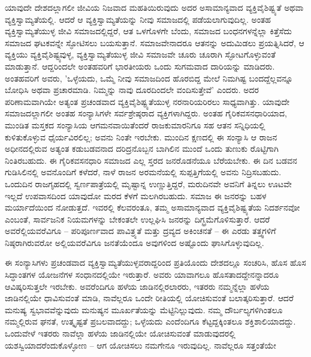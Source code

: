 ಯಾವುದೇ ದೇಶದಲ್ಲಾಗಲೀ ಜೀವಿಯ ನಿಜವಾದ ಮಹತಿಯಿರುವುದು ಅದರ ಅಸಾಮಾನ್ಯವಾದ ವ್ಯಕ್ತಿವೈಶಿಷ್ಟ್ಯತೆ ಅಥವಾ ವ್ಯಕ್ತಿಸ್ವಾಮ್ಯತೆಯಲ್ಲಿ. ಆದರೆ ಆ ವ್ಯಕ್ತಿಸ್ವಾಮ್ಯತೆಯನ್ನು ನೀವು ಸಮಾಜದಲ್ಲಿ ಪಡೆಯಲಾಗುವುದಿಲ್ಲ. ಅಂತಹ ವ್ಯಕ್ತಿಸ್ವಾಮ್ಯತೆಯುಳ್ಳ ಜೀವಿ ಸಮಾಜದಲ್ಲಿದ್ದರೆ, ಆತ ಒಳಗೊಳಗೇ ಬೆಂದು, ಸಮಾಜದ ಬಂಧನಗಳನ್ನೆಲ್ಲಾ ಕಿತ್ತೆಸೆದು ಸಮಾಜದ ಘಟಕವನ್ನೇ ಸ್ಫೋಟಿಸಲು ಬಯಸುತ್ತಾನೆ. ಸಮಾಜವೇನಾದರೂ ಆತನನ್ನು ಅದುಮಿಡಲು ಪ್ರಯತ್ನಿಸಿದರೆ, ಆ ವ್ಯಕ್ತಿಯು ವ್ಯಕ್ತಿವೈಶಿಷ್ಟ್ಯವುಳ್ಳ, ವ್ಯಕ್ತಿಸ್ವಾಮ್ಯತೆಯುಳ್ಳ ಜೀವಿ ಸಮಾಜವೇ ಚೂರು ಚೂರಾಗಿ ಸ್ಫೋಟಗೊಳ್ಳುವಂತೆ ಮಾಡುತ್ತಾನೆ. ಆದ್ದರಿಂದಲೇ ಅಂತಹವರಿಗೆ ಭಾರತೀಯರು ಒಂದು ಸುಗಮವಾದ ದಾರಿಯನ್ನು ಮಾಡಿದರು. ಅಂತಹವರಿಗೆ ಅವರು, 'ಒಳ್ಳೆಯದು, ಒಮ್ಮೆ ನೀವು ಸಮಾಜದಿಂದ ಹೊರಬಿದ್ದ ಮೇಲೆ ನಿಮಗಿಷ್ಟ ಬಂದದ್ದೆಲ್ಲವನ್ನೂ ಬೋಧಿಸಿ ಅಥವಾ ಪ್ರಚಾರಮಾಡಿ. ನಿಮ್ಮನ್ನು ನಾವು ದೂರದಿಂದಲೇ ವಂದಿಸುತ್ತೇವೆ' ಎಂದರು. ಅದರ ಪರಿಣಾಮವಾಗಿಯೇ ಅತ್ಯಂತ ಪ್ರಚಂಡವಾದ ವ್ಯಕ್ತಿವೈಶಿಷ್ಟ್ಯತೆಯುಳ್ಳ ನರನಾರಿಯರಿರಲು ಸಾಧ್ಯವಾಗಿತ್ತು. ಯಾವುದೇ ಸಮಾಜದಲ್ಲಾಗಲೀ ಅಂತಹ ಸಂನ್ಯಾಸಿಗಳೇ ಸರ್ವಶ್ರೇಷ್ಠರಾದ ವ್ಯಕ್ತಿಗಳಾಗಿದ್ದರು. ಅಂತಹ ಗೈರಿಕವಸನಧಾರಿಯಾದ, ಮುಂಡಿತ ಮಸ್ತಕದ ಸಂನ್ಯಾಸಿಯ ಆಗಮನವಾಯಿತೆಂದರೆ ರಾಜಕುಮಾರನಿಗೂ ಸಹ ಆತನ ಸನ್ನಿಧಿಯಲ್ಲಿ ಕುಳಿತುಕೊಳ್ಳುವ ಧೈರ್ಯವಿರಲಿಲ್ಲ; ಅವನು ನಿಂತೇ ಇರಬೇಕು. ಮುಂದಿನ ಕ್ಷಣದಲ್ಲಿ ಈ ಸಂನ್ಯಾಸಿ ಆ ರಾಜನ ಅಧೀನದಲ್ಲಿರುವ ಅತ್ಯಂತ ಕಡುಬಡವನಾದ ದರಿದ್ರನೊಬ್ಬನ ಬಾಗಿಲಿನ ಮುಂದೆ ಒಂದು ತುಣುಕು ರೊಟ್ಟಿಗಾಗಿ ನಿಂತಿರಬಹುದು. ಈ ಗೈರಿಕವಸನಧಾರಿ ಸಮಾಜದ ಎಲ್ಲ ಸ್ತರದ ಜನರೊಡನೆಯೂ ಬೆರೆಯಬೇಕು. ಈ ದಿನ ಬಡವನ ಗುಡಿಸಿಲಿನಲ್ಲಿ ಅವನೊಂದಿಗೆ ಕಳೆದರೆ, ನಾಳೆ ರಾಜನ ಅರಮನೆಯಲ್ಲಿ ಸುಪ್ಪತ್ತಿಗೆಯಲ್ಲಿ ಅವನು ನಿದ್ರಿಸಬಹುದು. ಒಂದುದಿನ ರಾಜಗೃಹದಲ್ಲಿ ಸ್ವರ್ಣಪಾತ್ರೆಯಲ್ಲಿ ಮೃಷ್ಟಾನ್ನ ಉಣ್ಣುತ್ತಿದ್ದರೆ, ಮರುದಿನವೇ ಅವನಿಗೆ ತಿನ್ನಲು ಊಟವೇ ಇಲ್ಲದೆ ಉಪವಾಸದಿಂದ ಯಾವುದೋ ಮರದ ಕೆಳಗೆ ಮಲಗಿರಬಹುದು. ಸಮಾಜ ಈ ಜನರನ್ನು ಬಹಳ ಮರ್ಯಾದೆಯಿಂದ ನೋಡುತ್ತದೆ. ಇವರಲ್ಲಿ ಕೆಲವರಂತೂ, ತಮ್ಮ ಅಸಾಮಾನ್ಯವಾದ ವ್ಯಕ್ತಿವೈಶಿಷ್ಟ್ಯತೆಯ ನಿದರ್ಶನವೋ ಎಂಬಂತೆ, ಸಾರ್ವಜನಿಕ ನಿಯಮಗಳನ್ನು ಬೇಕಂತಲೇ ಉಲ್ಲಘಿಸಿ ಜನರನ್ನು ದಿಗ್ಭ್ರಮೆಗೊಳಿಸುತ್ತಾರೆ. ಆದರೆ ಅವರೆಲ್ಲಿಯವರೆವಿಗೂ – ಪರಿಪೂರ್ಣವಾದ ಪಾವಿತ್ರ್ಯತೆ ಮತ್ತು ದ್ರವ್ಯದ ಅಕಿಂಚನತೆ – ಈ ಎರಡು ತತ್ತ್ವಗಳಿಗೆ ನಿಷ್ಠರಾಗಿರುವರೋ ಅಲ್ಲಿಯವರೆವಿಗೂ ಜನತೆಯೆಂದೂ ಅವುಗಳಿಂದ ಅಷ್ಟೊಂದು ಘಾಸಿಗೊಳ್ಳುವುದಿಲ್ಲ.

ಈ ಸಂನ್ಯಾಸಿಗಳು ಪ್ರಚಂಡವಾದ ವ್ಯಕ್ತಿಸ್ವಾಮ್ಯತೆಯುಳ್ಳವರಾದ್ದರಿಂದ ಪ್ರತಿಯೊಂದು ದೇಶದಲ್ಲೂ ಸಂಚರಿಸಿ, ಹೊಸ ಹೊಸ ಸಿದ್ಧಾಂತಗಳ ಯೋಜನೆಗಳ ಸಂಧಾನದಲ್ಲಿಯೇ ಇರುತ್ತಾರೆ. ಅವರು ಯಾವಾಗಲೂ ಹೊಸತಾದದ್ದೇನನ್ನಾದರೂ ಆವಿಷ್ಕರಿಸುತ್ತಲೇ ಇರಬೇಕು. ಅವರೆಂದಿಗೂ ಹಳೆಯ ಜಾಡಿನಲ್ಲಿರಲಾರರು, ಇತರರು ನಮ್ಮನ್ನೆಲ್ಲಾ ಹಳೆಯ ಜಾಡಿನಲ್ಲಿಯೇ ಧಾವಿಸುವಂತೆ ಮಾಡಿ, ನಾವೆಲ್ಲರೂ ಒಂದೇ ರೀತಿಯಲ್ಲಿ ಯೋಚಿಸುವಂತೆ ಬಲಾತ್ಕರಿಸುತ್ತಾರೆ. ಆದರೆ ಮನುಷ್ಯ ಸ್ವಭಾವವೆನ್ನುವುದು ಮನುಷ್ಯನ ಮೂರ್ಖತೆಯನ್ನು ಮೆಟ್ಟಿನಿಲ್ಲುವುದು. ನಮ್ಮ ದೌರ್ಬಲ್ಯಗಳಿಗಿಂತಲೂ ನಮ್ಮಲ್ಲಿರುವ ಘನತೆ, ಉತ್ಕೃಷ್ಟತೆ ಪ್ರಬಲವಾದದ್ದು; ಒಳ್ಳೆಯದು ಎಂದೆಂದಿಗೂ ಕೆಟ್ಟದ್ದಕ್ಕಿಂತಲೂ ಶಕ್ತಿಶಾಲಿಯಾದದ್ದು. ಒಂದುವೇಳೆ ಇತರರು ನಾವೆಲ್ಲಾ ಹಳೆಯ ಜಾಡಿನಲ್ಲಿಯೇ ಯೋಚಿಸುವಂತೆ ಮಾಡುವುದರಲ್ಲಿ ಯಶಸ್ವಿಯಾದರೆಂದುಕೊಳ್ಳೋಣ – ಆಗ ಯೋಚಿಸಲು ನಮಗೇನೂ ಇರುವುದಿಲ್ಲ. ನಾವೆಲ್ಲರೂ ಸತ್ತಂತೆಯೇ

